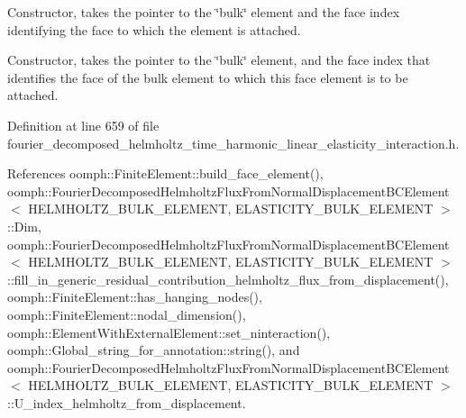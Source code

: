 Constructor, takes the pointer to the \char`\"{}bulk\char`\"{} element and the face index identifying the face to which the element is attached. 

Constructor, takes the pointer to the \char`\"{}bulk\char`\"{} element, and the face index that identifies the face of the bulk element to which this face element is to be attached. 

Definition at line 659 of file fourier\+\_\+decomposed\+\_\+helmholtz\+\_\+time\+\_\+harmonic\+\_\+linear\+\_\+elasticity\+\_\+interaction.\+h.



References oomph\+::\+Finite\+Element\+::build\+\_\+face\+\_\+element(), oomph\+::\+Fourier\+Decomposed\+Helmholtz\+Flux\+From\+Normal\+Displacement\+B\+C\+Element$<$ H\+E\+L\+M\+H\+O\+L\+T\+Z\+\_\+\+B\+U\+L\+K\+\_\+\+E\+L\+E\+M\+E\+N\+T, E\+L\+A\+S\+T\+I\+C\+I\+T\+Y\+\_\+\+B\+U\+L\+K\+\_\+\+E\+L\+E\+M\+E\+N\+T $>$\+::\+Dim, oomph\+::\+Fourier\+Decomposed\+Helmholtz\+Flux\+From\+Normal\+Displacement\+B\+C\+Element$<$ H\+E\+L\+M\+H\+O\+L\+T\+Z\+\_\+\+B\+U\+L\+K\+\_\+\+E\+L\+E\+M\+E\+N\+T, E\+L\+A\+S\+T\+I\+C\+I\+T\+Y\+\_\+\+B\+U\+L\+K\+\_\+\+E\+L\+E\+M\+E\+N\+T $>$\+::fill\+\_\+in\+\_\+generic\+\_\+residual\+\_\+contribution\+\_\+helmholtz\+\_\+flux\+\_\+from\+\_\+displacement(), oomph\+::\+Finite\+Element\+::has\+\_\+hanging\+\_\+nodes(), oomph\+::\+Finite\+Element\+::nodal\+\_\+dimension(), oomph\+::\+Element\+With\+External\+Element\+::set\+\_\+ninteraction(), oomph\+::\+Global\+\_\+string\+\_\+for\+\_\+annotation\+::string(), and oomph\+::\+Fourier\+Decomposed\+Helmholtz\+Flux\+From\+Normal\+Displacement\+B\+C\+Element$<$ H\+E\+L\+M\+H\+O\+L\+T\+Z\+\_\+\+B\+U\+L\+K\+\_\+\+E\+L\+E\+M\+E\+N\+T, E\+L\+A\+S\+T\+I\+C\+I\+T\+Y\+\_\+\+B\+U\+L\+K\+\_\+\+E\+L\+E\+M\+E\+N\+T $>$\+::\+U\+\_\+index\+\_\+helmholtz\+\_\+from\+\_\+displacement.

\mbox{\label{classoomph_1_1FourierDecomposedHelmholtzFluxFromNormalDisplacementBCElement_aafab69b927f48ec192cf48cf7fde7712}} 
